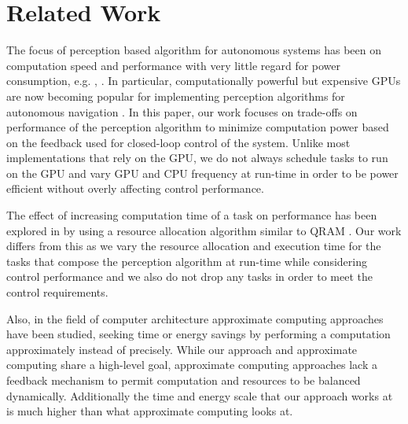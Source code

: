 \section{Related Work}

The focus of perception based algorithm for autonomous systems has been on computation speed and performance with very little regard for power consumption, e.g. \cite{forster2014svo}, \cite{CUDASLAM}. In particular, computationally powerful but expensive GPUs are now becoming popular for implementing perception algorithms for autonomous navigation \cite{CUDASLAM}. In this paper, our work focuses on trade-offs on performance of the perception algorithm to minimize computation power based on the feedback used for closed-loop control of the system. Unlike most implementations that rely on the GPU, we do not always schedule tasks to run on the GPU and vary GPU and CPU frequency at run-time in order to be power efficient without overly affecting control performance.

The effect of increasing computation time of a task on performance has been explored in \cite{overbook} by using a resource allocation algorithm similar to QRAM \cite{qram}. Our work differs from this as we vary the resource allocation and execution time for the tasks that compose the perception algorithm at run-time while considering control performance and we also do not drop any tasks in order to meet the control requirements.

Also, in the field of computer architecture approximate computing approaches \cite{loop-perf,rely,npu} have been studied, seeking time or energy
savings by performing a computation approximately instead of precisely. While
our approach and approximate computing share a high-level goal,
approximate computing approaches lack a feedback mechanism to permit computation and resources to be balanced dynamically. Additionally the time and energy scale that our approach works at is much higher than what approximate computing looks at.